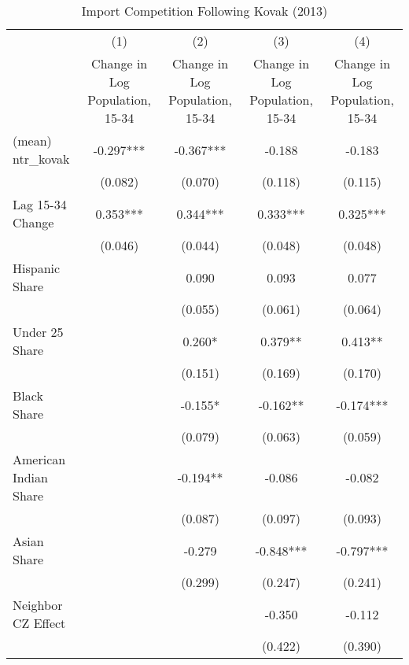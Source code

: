 \begin{table}[htbp]\centering
\def\sym#1{\ifmmode^{#1}\else\(^{#1}\)\fi}
\caption{Import Competition Following Kovak (2013)}
\begin{tabular}{l*{4}{c}}
\toprule
                    &\multicolumn{1}{c}{(1)}&\multicolumn{1}{c}{(2)}&\multicolumn{1}{c}{(3)}&\multicolumn{1}{c}{(4)}\\
                    &\multicolumn{1}{c}{Change in Log Population, 15-34}&\multicolumn{1}{c}{Change in Log Population, 15-34}&\multicolumn{1}{c}{Change in Log Population, 15-34}&\multicolumn{1}{c}{Change in Log Population, 15-34}\\
\midrule
(mean) ntr\_kovak    &   -0.297***&   -0.367***&   -0.188   &   -0.183   \\
                    &  (0.082)   &  (0.070)   &  (0.118)   &  (0.115)   \\
\addlinespace
Lag 15-34 Change    &    0.353***&    0.344***&    0.333***&    0.325***\\
                    &  (0.046)   &  (0.044)   &  (0.048)   &  (0.048)   \\
\addlinespace
Hispanic Share      &            &    0.090   &    0.093   &    0.077   \\
                    &            &  (0.055)   &  (0.061)   &  (0.064)   \\
\addlinespace
Under 25 Share      &            &    0.260*  &    0.379** &    0.413** \\
                    &            &  (0.151)   &  (0.169)   &  (0.170)   \\
\addlinespace
Black Share         &            &   -0.155*  &   -0.162** &   -0.174***\\
                    &            &  (0.079)   &  (0.063)   &  (0.059)   \\
\addlinespace
American Indian Share&            &   -0.194** &   -0.086   &   -0.082   \\
                    &            &  (0.087)   &  (0.097)   &  (0.093)   \\
\addlinespace
Asian Share         &            &   -0.279   &   -0.848***&   -0.797***\\
                    &            &  (0.299)   &  (0.247)   &  (0.241)   \\
\addlinespace
Neighbor CZ Effect  &            &            &   -0.350   &   -0.112   \\
                    &            &            &  (0.422)   &  (0.390)   \\

\end{tabular}
\end{table}
